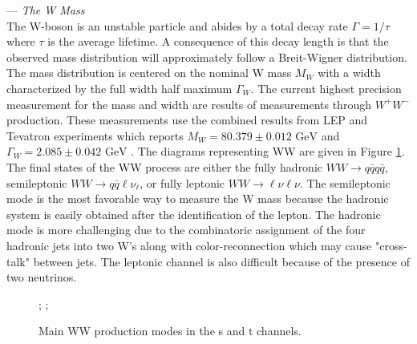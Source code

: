 --- \textit {The W Mass}\\
The W-boson is an unstable particle and abides by a total decay rate $\Gamma = 1/\tau$ where $\tau$ is the average lifetime.  A consequence of this decay length is that the observed mass distribution will approximately follow a Breit-Wigner distribution. The mass distribution is centered on the nominal W mass $M_W$ with a width characterized by the full width half maximum $\Gamma_W$. The current highest precision measurement for the mass and width are results of measurements through $W^+W^-$ production. These measurements use the combined results from LEP and Tevatron experiments which reports $M_W = 80.379 \pm 0.012 \, \, \text{GeV} $ and $\Gamma_W = 2.085 \pm 0.042 \,  \,\text{GeV}$ \cite{pdg}. The diagrams representing WW are given in Figure \ref{fig:wwdiag}. The final states of the WW process are either the fully hadronic $WW\rightarrow q\bar{q}q\bar{q}$, semileptonic $WW\rightarrow q\bar{q}\ell\nu_{\ell}$, or fully leptonic $WW\rightarrow \ell \nu \ell \nu$. The semileptonic mode is the most favorable way to measure the W mass because the hadronic system is easily obtained after the identification of the lepton. The hadronic mode is more challenging due to the combinatoric assignment of the four hadronic jets into two W's along with color-reconnection which may cause "cross-talk" between jets. The leptonic channel is also difficult because of the presence of two neutrinos.


\begin{figure}
\centering
{};
    ;
\caption{\label{fig:wwdiag} Main WW production modes in the s and t channels. }
\end{figure}

  

